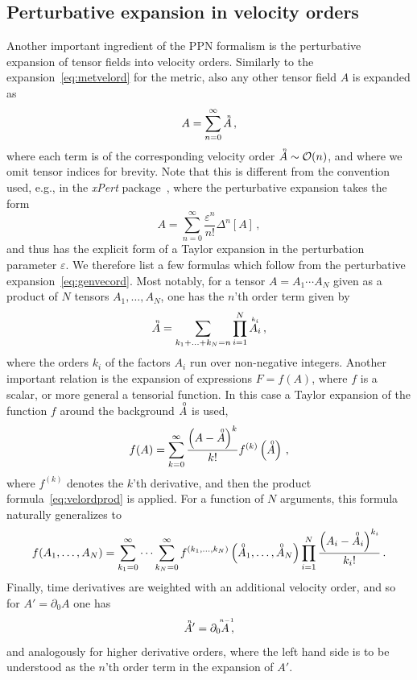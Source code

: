 \documentclass[notitlepage,a4paper,aps,prd,onecolumn,superscriptaddress,nofootinbib,groupedaddress,longbibliography]{revtex4-1}
\newcommand{\order}[2]{\accentset{#2}{#1}}
\newcommand{\xPert}{\emph{xPert}}
\begin{document}
\subsection{Perturbative expansion in velocity orders}\label{ssec:perturb}
Another important ingredient of the PPN formalism is the perturbative expansion of tensor fields into velocity orders. Similarly to the expansion~\eqref{eq:metvelord} for the metric, also any other tensor field \(A\) is expanded as
\begin{equation}\label{eq:genvecord}
A = \sum_{n = 0}^{\infty}\order{A}{n}\,,
\end{equation}
where each term is of the corresponding velocity order \(\order{A}{n} \sim \mathcal{O}(n)\), and where we omit tensor indices for brevity. Note that this is different from the convention used, e.g., in the \xPert{} package~\cite{Brizuela:2008ra}, where the perturbative expansion takes the form
\begin{equation}
A = \sum_{n = 0}^{\infty}\frac{\varepsilon^n}{n!}\Delta^n[A]\,,
\end{equation}
and thus has the explicit form of a Taylor expansion in the perturbation parameter \(\varepsilon\). We therefore list a few formulas which follow from the perturbative expansion~\eqref{eq:genvecord}. Most notably, for a tensor \(A = A_1 \cdots A_N\) given as a product of \(N\) tensors \(A_1, \ldots, A_N\), one has the $n$'th order term given by
\begin{equation}\label{eq:velordprod}
\order{A}{n} = \sum_{k_1 + \ldots + k_N = n}\prod_{i = 1}^{N}\order{A_i}{k_i}\,,
\end{equation}
where the orders \(k_i\) of the factors \(A_i\) run over non-negative integers. Another important relation is the expansion of expressions \(F = f(A)\), where \(f\) is a scalar, or more general a tensorial function. In this case a Taylor expansion of the function \(f\) around the background \(\order{A}{0}\) is used,
\begin{equation}
f(A) = \sum_{k = 0}^{\infty}\frac{\left(A - \order{A}{0}\right)^k}{k!}f^{(k)}\left(\order{A}{0}\right)\,,
\end{equation}
where \(f^{(k)}\) denotes the $k$'th derivative, and then the product formula~\eqref{eq:velordprod} is applied. For a function of \(N\) arguments, this formula naturally generalizes to
\begin{equation}\label{eq:velordfunc}
f(A_1, \ldots, A_N) = \sum_{k_1 = 0}^{\infty} \cdots \sum_{k_N = 0}^{\infty}f^{(k_1, \ldots, k_N)}\left(\order{A}{0}_1, \ldots, \order{A}{0}_N\right)\prod_{i = 1}^{N}\frac{\left(A_i - \order{A}{0}_i\right)^{k_i}}{k_i!}\,.
\end{equation}
Finally, time derivatives are weighted with an additional velocity order, and so for \(A' = \partial_0A\) one has
\begin{equation}\label{eq:velordtimed}
\order{A}{n}' = \partial_0\order{A}{n - 1}\,,
\end{equation}
and analogously for higher derivative orders, where the left hand side is to be understood as the $n$'th order term in the expansion of \(A'\).
\end{document}
